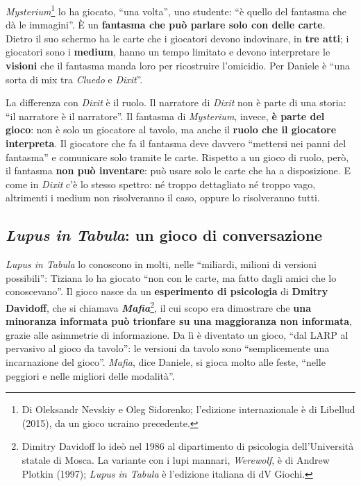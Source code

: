 \emph{Mysterium}\footnote{Di Oleksandr Nevskiy e Oleg Sidorenko; l'edizione internazionale è di
Libellud (2015), da un gioco ucraino precedente.} lo ha giocato, ``una volta'', uno studente: ``è
quello del fantasma che dà le immagini''. È un \textbf{fantasma che può parlare solo con delle
carte}. Dietro il suo schermo ha le carte che i giocatori devono indovinare, in \textbf{tre
atti}; i giocatori sono i \textbf{medium}, hanno un tempo limitato e devono interpretare le
\textbf{visioni} che il fantasma manda loro per ricostruire l'omicidio. Per Daniele è ``una
sorta di mix tra \emph{Cluedo} e \emph{Dixit}''.

La differenza con \emph{Dixit} è il ruolo. Il narratore di \emph{Dixit} non è parte di una
storia: ``il narratore è il narratore''. Il fantasma di \emph{Mysterium}, invece, \textbf{è
parte del gioco}: non è solo un giocatore al tavolo, ma anche il \textbf{ruolo che il giocatore
interpreta}. Il giocatore che fa il fantasma deve davvero ``mettersi nei panni del fantasma'' e
comunicare solo tramite le carte. Rispetto a un gioco di ruolo, però, il fantasma \textbf{non
può inventare}: può usare solo le carte che ha a disposizione. E come in \emph{Dixit} c'è lo
stesso spettro: né troppo dettagliato né troppo vago, altrimenti i medium non risolveranno il
caso, oppure lo risolveranno tutti.

\subsection{\emph{Lupus in Tabula}: un gioco di conversazione}



\emph{Lupus in Tabula} lo conoscono in molti, nelle ``miliardi, milioni di versioni possibili'':
Tiziana lo ha giocato ``non con le carte, ma fatto dagli amici che lo conoscevano''. Il gioco
nasce da un \textbf{esperimento di psicologia} di \textbf{Dmitry Davidoff}, che si chiamava
\textbf{\emph{Mafia}}\footnote{Dimitry Davidoff lo ideò nel 1986 al dipartimento di psicologia
dell'Università statale di Mosca. La variante con i lupi mannari, \emph{Werewolf}, è di Andrew
Plotkin (1997); \emph{Lupus in Tabula} è l'edizione italiana di dV Giochi.}, il cui scopo era
dimostrare che \textbf{una minoranza informata può trionfare su una maggioranza non informata},
grazie alle asimmetrie di informazione. Da lì è diventato un gioco, ``dal LARP al pervasivo al
gioco da tavolo'': le versioni da tavolo sono ``semplicemente una incarnazione del gioco''.
\emph{Mafia}, dice Daniele, si gioca molto alle feste, ``nelle peggiori e nelle migliori delle
modalità''.

